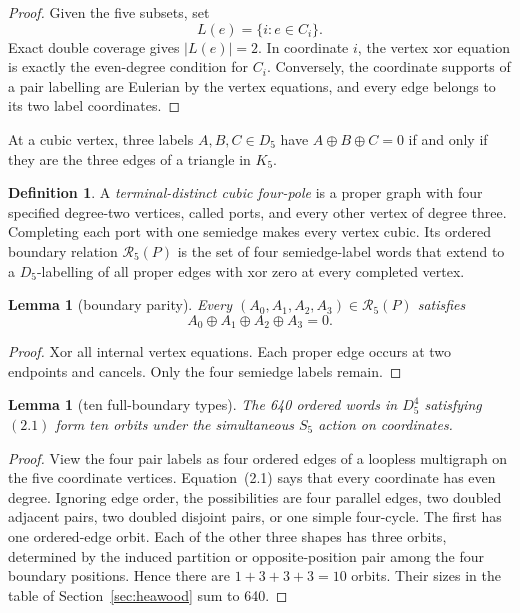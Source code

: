 \documentclass[11pt]{article}
\newtheorem{lemma}[theorem]{Lemma}
\theoremstyle{definition}
\newtheorem{definition}[theorem]{Definition}
\theoremstyle{remark}
\newcommand{\xor}{\mathbin{\oplus}}
\newcommand{\Dfive}{D_5}
\begin{document}
\begin{proof}
Given the five subsets, set
\[
                   L(e)=\{i:e\in C_i\}.
\]
Exact double coverage gives \(|L(e)|=2\).  In coordinate \(i\), the
vertex xor equation is exactly the even-degree condition for \(C_i\).
Conversely, the coordinate supports of a pair labelling are Eulerian by
the vertex equations, and every edge belongs to its two label coordinates.
\end{proof}

At a cubic vertex, three labels \(A,B,C\in\Dfive\) have
\(A\xor B\xor C=0\) if and only if they are the three edges of a triangle
in \(K_5\).

\begin{definition}
A \emph{terminal-distinct cubic four-pole} is a proper graph with four
specified degree-two vertices, called ports, and every other vertex of
degree three.  Completing each port with one semiedge makes every vertex
cubic.  Its ordered boundary relation \(\mathcal R_5(P)\) is the set of
four semiedge-label words that extend to a \(\Dfive\)-labelling of all
proper edges with xor zero at every completed vertex.
\end{definition}

\begin{lemma}[boundary parity]\label{lem:boundary-parity}
Every \((A_0,A_1,A_2,A_3)\in\mathcal R_5(P)\) satisfies
\[
                         A_0\xor A_1\xor A_2\xor A_3=0.       \tag{2.1}
\]
\end{lemma}

\begin{proof}
Xor all internal vertex equations.  Each proper edge occurs at two
endpoints and cancels.  Only the four semiedge labels remain.
\end{proof}

\begin{lemma}[ten full-boundary types]\label{lem:ten-types}
The 640 ordered words in \(\Dfive^4\) satisfying \((2.1)\) form ten orbits
under the simultaneous \(S_5\) action on coordinates.
\end{lemma}

\begin{proof}
View the four pair labels as four ordered edges of a loopless multigraph on
the five coordinate vertices.  Equation~(2.1) says that every coordinate
has even degree.  Ignoring edge order, the possibilities are four parallel
edges, two doubled adjacent pairs, two doubled disjoint pairs, or one
simple four-cycle.  The first has one ordered-edge orbit.  Each of the
other three shapes has three orbits, determined by the induced partition
or opposite-position pair among the four boundary positions.  Hence there
are \(1+3+3+3=10\) orbits.  Their sizes in the table of
Section~\ref{sec:heawood} sum to 640.
\end{proof}
\end{document}
